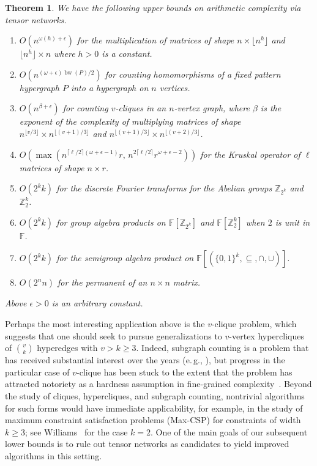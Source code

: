 \documentclass[11pt]{article}
\numberwithin{equation}{section}
\newtheorem{theorem}{Theorem}[section]
\theoremstyle{definition}
\theoremstyle{plain}
\newcommand{\Z}{\mathbb Z}
\newcommand{\eg}{e.\,g.}
\DeclareMathOperator{\bw}{bw}
\newcommand{\F}{\ensuremath{\mathbb{F}}}
\begin{document}
\begin{theorem}
  \label{thm:upper bounds}
  We have the following upper bounds on arithmetic complexity via tensor
networks. %
  \begin{enumerate}
  \item $O(n^{\omega(h) + \epsilon})$ for the multiplication of matrices of shape $n \times \lfloor n^h \rfloor$ and $\lfloor n^h \rfloor \times n$
where $h > 0$ is a constant. %
%
  \item $O(n^{(\omega+\epsilon) \bw(P)/2})$ for counting homomorphisms of a fixed pattern hypergraph $P$ into a hypergraph on $n$ vertices.
  \item $O(n^{\beta + \epsilon})$ for counting $v$-cliques in an $n$-vertex graph, where $\beta$ is the exponent of the complexity of multiplying matrices of shape $n^{\lfloor v/3 \rfloor} \times n^{\lfloor (v+1)/3 \rfloor}$ and $n^{\lfloor (v+1)/3 \rfloor} \times n^{\lfloor (v+2)/3 \rfloor}$.
  \item $O(\max(n^{\lceil\ell/2\rceil(\omega+\epsilon-1)}r,\,n^{2\lceil\ell/2\rceil}r^{\omega+\epsilon-2}))$ for the Kruskal operator of $\ell$ matrices of shape $n\times r$.
  \item $O(2^k k)$ for the discrete Fourier transforms for the Abelian groups $\Z_{2^k}$ and $\Z_2^k$.
  \item $O(2^kk)$ for group algebra products on $\F[\Z_{2^k}]$ and $\F[\Z_2^k]$ when $2$ is unit in $\F$.
  \item $O(2^kk)$ for the semigroup algebra product on $\F[(\{0,1\}^k,\subseteq,\cap,\cup)]$.
  \item $O(2^n n)$ for the permanent of an $n \times n$ matrix.
  \end{enumerate}
Above $\epsilon>0$ is an arbitrary constant.
\end{theorem}


Perhaps the most interesting application above
is the $v$-clique problem, which suggests that one should seek to
pursue generalizations to $v$-vertex hypercliques of
$\binom{v}{k}$ hyperedges with $v>k\geq 3$.
Indeed, subgraph counting is a problem that has received substantial
interest over the years (\eg, \cite{%
ItaiR1978,%
Nesetril1985,%
AlonYZ1997,%
AlonG2010,%
EisenbrandG2004,%
BjorklundHKK2009,%
BjorklundKK2014,%
WilliamsWWY15,%
WilliamsW2013,%
FominLRSR2012,%
FloderusKLL2015,%
Olariu1988,%
KloksKM2000,%
CurticapeanDM2017}), but progress in the particular case of $v$-clique
has been stuck to the extent that the problem has attracted notoriety as
a hardness assumption in fine-grained
complexity~\cite{AbboudBBK2017,AbboudBW15a}.
Beyond the study of cliques, hypercliques, and subgraph counting, nontrivial
algorithms for such forms would have immediate applicability, for example,
in the study of maximum constraint satisfaction problems (Max-CSP) for
constraints of width $k\geq 3$; 
see Williams~\cite{Williams2005} %
for
the case $k=2$. One of the main goals of our subsequent lower bounds is
to rule out tensor networks as %
candidates  %
to yield improved algorithms in this setting.
\end{document}
